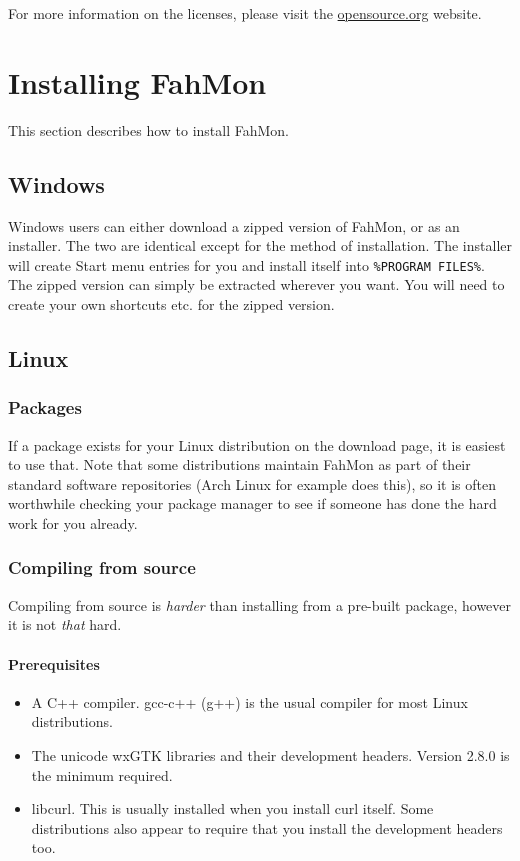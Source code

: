 For more information on the licenses, please visit the \url{opensource.org}
website.

\section{Installing FahMon}

This section describes how to install FahMon.

\subsection{Windows}

Windows users can either download a zipped version of FahMon, or as an
installer. The two are identical except for the method of installation. The
installer will create Start menu entries for you and install itself into
\texttt{\%PROGRAM FILES\%}. The zipped version can simply be extracted wherever
you want. You will need to create your own shortcuts etc. for the zipped
version.

\subsection{Linux}

\subsubsection{Packages}

If a package exists for your Linux distribution on the download page, it is
easiest to use that. Note that some distributions maintain FahMon as part of
their standard software repositories (Arch Linux for example does this), so it
is often worthwhile checking your package manager to see if someone has done the
hard work for you already.

\subsubsection{Compiling from source}

Compiling from source is \textit{harder} than installing from a pre-built
package, however it is not \textit{that} hard.

\paragraph{Prerequisites}

\begin{itemize}
 \item A C++ compiler. gcc-c++ (g++) is the usual compiler for most Linux
 distributions.
 \item The unicode wxGTK libraries and their development headers. Version 2.8.0
 is the minimum required.
 \item libcurl. This is usually installed when you install curl itself. Some
 distributions also appear to require that you install the development headers
 too.
\end{itemize}

